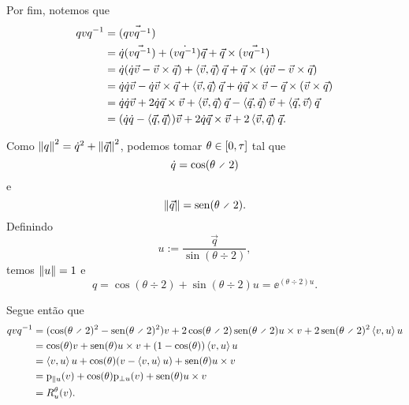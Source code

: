 Por fim, notemos que
	\begin{align*}
	qvq^{-1} &= \vec{(qvq^{-1})} \\
		&= \dot{q}\vec{(vq^{-1})}+\dot{(vq^{-1})}\vec{q}+\vec{q} \times \vec{(vq^{-1})} \\
		&= \dot{q}(\dot{q}\vec{v}-\vec{v}\times \vec{q})+\left\langle{\vec{v}},{\vec{q}}\right\rangle\vec{q}+\vec{q} \times (\dot{q}\vec{v}-\vec{v}\times \vec{q}) \\
		&= \dot{q}\dot{q}\vec{v}-\dot{q}\vec{v}\times \vec{q} + \left\langle{\vec{v}},{\vec{q}}\right\rangle\vec{q} + \dot{q} \vec{q} \times \vec{v} - \vec{q} \times (\vec{v}\times \vec{q}) \\
		&= \dot{q}\dot{q}\vec{v}+2\dot{q}\vec{q}\times \vec{v} + \left\langle{\vec{v}},{\vec{q}}\right\rangle\vec{q} - \left\langle{\vec{q}},{\vec{q}}\right\rangle\vec{v} + \left\langle{\vec{q}},{\vec{v}}\right\rangle\vec{q} \\
		&= (\dot{q}\dot{q} - \left\langle{\vec{q}},{\vec{q}}\right\rangle)\vec{v}+2\dot{q}\vec{q}\times \vec{v} + 2\left\langle{\vec{v}},{\vec{q}}\right\rangle\vec{q}.
	\end{align*}
	
Como $\left\Vert{q}\right\Vert^2 = \dot{q}^2 + \left\Vert{\vec{q}}\right\Vert^2$, podemos tomar $\theta \in \left[{0},{\tau}\right]$ tal que
	\begin{equation*}
	\esc{q} = \cos(\theta \div 2)
	\end{equation*}
e
	\begin{equation*}
	\nor{\vec{q}} = \sin(\theta \div 2).
	\end{equation*}
Definindo
	\begin{equation*}
	u := \frac{\vec{q}}{\sin(\theta \div 2)},
	\end{equation*}
temos $\left\Vert{u}\right\Vert=1$ e
	\begin{equation*}
	q=\cos(\theta \div 2)+\sin(\theta \div 2)u = \ee^{(\theta \div 2)u}.
	\end{equation*}

Segue então que
	\begin{align*}
	qvq\inv 
		&= (\cos(\theta \div 2)^2-\sin(\theta \div 2)^2)v + 2\cos(\theta \div 2)\sin(\theta \div 2){u \times v} + 2\sin(\theta \div 2)^2\inte{v}{u}u \\
		&= \cos(\theta) v + \sin(\theta) u \times v + (1-\cos(\theta))\inte{v}{u}u \\
		&= \inte{v}{u}u + \cos(\theta) (v-\inte{v}{u}u) + \sin(\theta) u \times v \\
		&= \proj_{\parallel u}(v) + \cos(\theta) \proj_{\perp u}(v) + \sin(\theta) u \times v \\
		&= R^\theta_u(v).
	\end{align*}

